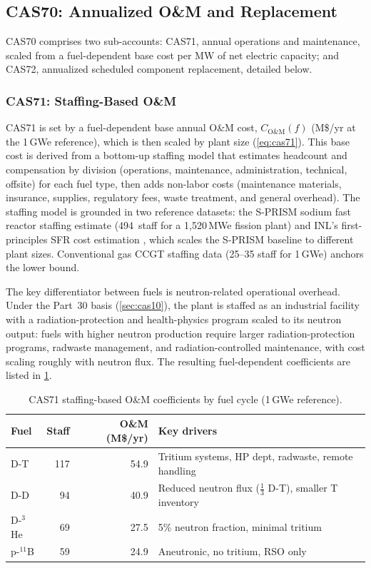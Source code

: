 \documentclass{article}
\begin{document}
\subsection{CAS70: Annualized O\&M and Replacement}
\label{sec:cas70}

CAS70 comprises two sub-accounts: CAS71, annual operations and
maintenance, scaled from a fuel-dependent base cost per MW of net
electric capacity; and CAS72, annualized scheduled component
replacement, detailed below.

\subsubsection{CAS71: Staffing-Based O\&M}
CAS71 is set by a fuel-dependent base annual O\&M cost,
$C_{\text{O\&M}}(f)$ (M\$/yr at the 1\,GWe reference), which is then
scaled by plant size (\cref{eq:cas71}). This base
cost is derived from a bottom-up staffing model that estimates headcount
and compensation by division (operations, maintenance, administration,
technical, offsite) for each fuel type, then adds non-labor costs
(maintenance materials, insurance, supplies, regulatory fees, waste
treatment, and general overhead). The staffing
model is grounded in two reference datasets: the S-PRISM sodium fast
reactor staffing estimate \citep{boardman2000} (494~staff for a
1{,}520\,MWe fission plant) and INL's first-principles SFR cost
estimation \citep{prosser2024}, which scales the S-PRISM baseline to
different plant sizes. Conventional gas CCGT staffing data (25--35
staff for 1\,GWe) anchors the lower bound.

The key differentiator between fuels is neutron-related operational
overhead. Under the Part~30 basis (\cref{sec:cas10}), the plant is
staffed as an industrial facility with a radiation-protection and
health-physics program scaled to its neutron output: fuels with higher
neutron production require larger radiation-protection programs, radwaste
management, and radiation-controlled maintenance, with cost scaling
roughly with neutron flux. The resulting fuel-dependent coefficients are listed
in \cref{tab:cas71-staffing}.

\begin{table}[htbp]
\caption{CAS71 staffing-based O\&M coefficients by fuel cycle (1\,GWe reference).}
\label{tab:cas71-staffing}
\centering
\begin{tabular}{lrrl}
\toprule
Fuel & Staff & O\&M (M\$/yr) & Key drivers \\
\midrule
D-T   & 117 & 54.9 & Tritium systems, HP dept, radwaste, remote handling \\
D-D   &  94 & 40.9 & Reduced neutron flux ($\tfrac{1}{3}$ D-T), smaller T inventory \\
D-${}^3$He &  69 & 27.5 & 5\% neutron fraction, minimal tritium \\
p-${}^{11}$B &  59 & 24.9 & Aneutronic, no tritium, RSO only \\
\bottomrule
\end{tabular}
\end{table}
\end{document}

